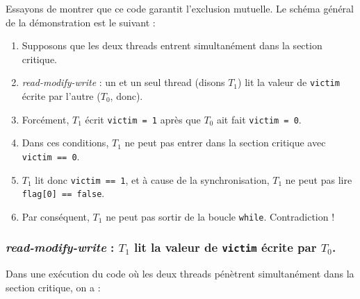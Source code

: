 Essayons de montrer que ce code garantit l'exclusion mutuelle. Le schéma général de la démonstration est le suivant :
\begin{enumerate}
\item Supposons que les deux threads entrent simultanément dans la section critique.
\item \emph{read-modify-write} : un et un seul thread (disons $T_1$) lit la valeur de \texttt{victim} écrite par l'autre ($T_0$, donc).
\item Forcément, $T_1$ écrit \texttt{victim = 1} après que $T_0$ ait fait \texttt{victim = 0}.
\item Dans ces conditions, $T_1$ ne peut pas entrer dans la section critique avec \texttt{victim == 0}.
\item $T_1$ lit donc \texttt{victim == 1}, et à cause de la synchronisation, $T_1$ ne peut pas lire \texttt{flag[0] == false}.
\item Par conséquent, $T_1$ ne peut pas sortir de la boucle \texttt{while}. Contradiction !
\end{enumerate}

\subsubsection{\emph{read-modify-write} : $T_1$ lit la valeur de \texttt{victim} écrite par $T_0$.}


Dans une exécution du code où les deux threads pénètrent simultanément dans la
section critique, on a :

